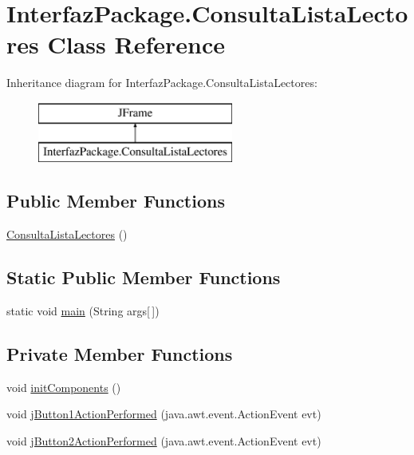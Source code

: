 \hypertarget{class_interfaz_package_1_1_consulta_lista_lectores}{}\section{Interfaz\+Package.\+Consulta\+Lista\+Lectores Class Reference}
\label{class_interfaz_package_1_1_consulta_lista_lectores}
Inheritance diagram for Interfaz\+Package.\+Consulta\+Lista\+Lectores\+:\begin{figure}[H]
\begin{center}
\leavevmode
\includegraphics[height=2.000000cm]{class_interfaz_package_1_1_consulta_lista_lectores}
\end{center}
\end{figure}
\subsection*{Public Member Functions}
\begin{DoxyCompactItemize}
\item 
\mbox{\hyperlink{class_interfaz_package_1_1_consulta_lista_lectores_a2068efbdca2416de4628a028be002f0c}{Consulta\+Lista\+Lectores}} ()
\end{DoxyCompactItemize}
\subsection*{Static Public Member Functions}
\begin{DoxyCompactItemize}
\item 
static void \mbox{\hyperlink{class_interfaz_package_1_1_consulta_lista_lectores_abda247dfb07cabb8854bdbd8d033f89e}{main}} (String args\mbox{[}$\,$\mbox{]})
\end{DoxyCompactItemize}
\subsection*{Private Member Functions}
\begin{DoxyCompactItemize}
\item 
void \mbox{\hyperlink{class_interfaz_package_1_1_consulta_lista_lectores_a6c8f44a19bc6e5223ce9d5d1e952e0a6}{init\+Components}} ()
\item 
void \mbox{\hyperlink{class_interfaz_package_1_1_consulta_lista_lectores_aa12d9387e1fcdb4bacd13a7d3471f709}{j\+Button1\+Action\+Performed}} (java.\+awt.\+event.\+Action\+Event evt)
\item 
void \mbox{\hyperlink{class_interfaz_package_1_1_consulta_lista_lectores_ac0dc90c31a97f36fc10ea54c3d0c6a55}{j\+Button2\+Action\+Performed}} (java.\+awt.\+event.\+Action\+Event evt)
\end{DoxyCompactItemize}
